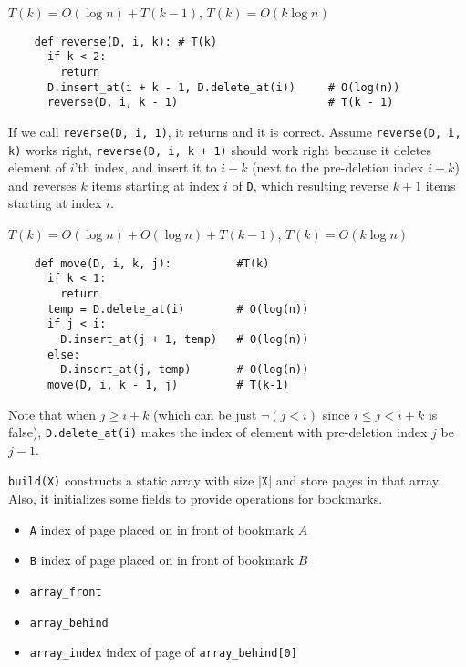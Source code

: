 \documentclass[12pt,twoside]{article}
\begin{document}
\begin{problems}
\begin{problemparts}
\end{problemparts}

\newpage
\problem  %

\begin{problemparts}
  \problempart %
  $T(k) = O(\log n) + T(k - 1)$, $T(k) = O(k\log n)$
  \begin{lstlisting}
    def reverse(D, i, k): # T(k)
      if k < 2:
        return
      D.insert_at(i + k - 1, D.delete_at(i))     # O(log(n))
      reverse(D, i, k - 1)                       # T(k - 1)
  \end{lstlisting}
  If we call \texttt{reverse(D, i, 1)}, it returns and it is correct.
  Assume \texttt{reverse(D, i, k)} works right, \texttt{reverse(D, i,
    k + 1)} should work right because it deletes element of $i$'th
  index, and insert it to $i + k$ (next to the pre-deletion index
  $i + k$) and reverses $k$ items starting at index $i$ of \texttt{D},
  which resulting reverse $k+1$ items starting at index $i$.
  
  \problempart %
  $T(k) = O(\log n) + O(\log n) + T(k-1)$, $T(k) = O(k\log n)$
  
  \begin{lstlisting}
    def move(D, i, k, j):          #T(k)
      if k < 1:
        return
      temp = D.delete_at(i)        # O(log(n))
      if j < i:
        D.insert_at(j + 1, temp)   # O(log(n))
      else:
        D.insert_at(j, temp)       # O(log(n))
      move(D, i, k - 1, j)         # T(k-1)
  \end{lstlisting}
    
  Note that when $j\geq i + k$ (which can be just $\neg(j < i)$ since
  $i\leq j < i+k$ is false), \texttt{D.delete\_at(i)} makes
  the index of element with pre-deletion index $j$ be $j-1$.
  
\end{problemparts}

\newpage
\problem %
\texttt{build(X)} constructs a static array with size $|\texttt{X}|$
and store pages in that array. Also, it initializes some fields to
provide operations for bookmarks.

\begin{itemize}
  \item \texttt{A} index of page placed on in front of bookmark $A$
  \item \texttt{B} index of page placed on in front of bookmark $B$
  \item \texttt{array\_front}
  \item \texttt{array\_behind}
  \item \texttt{array\_index} index of page of \texttt{array\_behind[0]}
\end{itemize}


\end{problems}
\end{document}
